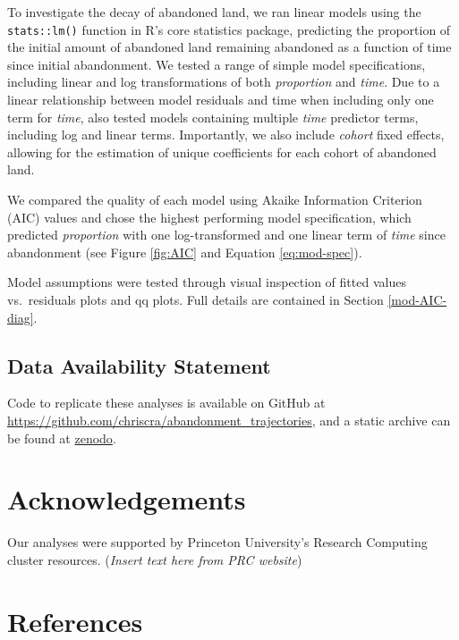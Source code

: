 \documentclass[
]{article}
\begin{document}
To investigate the decay of abandoned land, we ran linear models using the \texttt{stats::lm()} function in R's core statistics package, predicting the proportion of the initial amount of abandoned land remaining abandoned as a function of time since initial abandonment.
We tested a range of simple model specifications, including linear and log transformations of both \emph{proportion} and \emph{time}.
Due to a linear relationship between model residuals and time when including only one term for \emph{time}, also tested models containing multiple \emph{time} predictor terms, including log and linear terms.
Importantly, we also include \emph{cohort} fixed effects, allowing for the estimation of unique coefficients for each cohort of abandoned land.

We compared the quality of each model using Akaike Information Criterion (AIC) values and chose the highest performing model specification, which predicted \emph{proportion} with one log-transformed and one linear term of \emph{time} since abandonment (see Figure \ref{fig:AIC} and Equation \eqref{eq:mod-spec}).

Model assumptions were tested through visual inspection of fitted values vs.~residuals plots and qq plots.
Full details are contained in Section \ref{mod-AIC-diag}.

\hypertarget{data-availability-statement}{%
\subsection{Data Availability Statement}\label{data-availability-statement}}

Code to replicate these analyses is available on GitHub at \url{https://github.com/chriscra/abandonment_trajectories}, and a static archive can be found at \href{https://doi.org/}{zenodo}.

\hypertarget{acknowledgements}{%
\section{Acknowledgements}\label{acknowledgements}}

Our analyses were supported by Princeton University's Research Computing cluster resources. (\emph{Insert text here from PRC website})

\newpage

\hypertarget{references}{%
\section{References}\label{references}}
\end{document}

